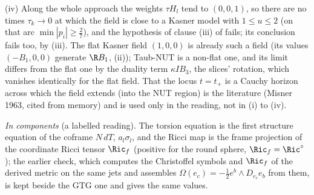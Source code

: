 (iv) Along the whole approach the weights $\tau H_{l}$ tend to $(0, 0, 1)$, so there are no times $\tau_{k} \to 0$ at which the field is close to a Kasner model with $1 \le u \le 2$ (on that arc $\min|p_{i}| \ge \tfrac27$), and the hypothesis of clause (iii) of  fails; its conclusion fails too, by (iii). The flat Kasner field $(1, 0, 0)$ is already such a field (its values $(-B_{1}, 0, 0)$ generate $\R B_{1}$, (ii)); Taub-NUT is a non-flat one, and its limit differs from the flat one by the duality term $\kappa IB_{3}$, the slices' rotation, which vanishes identically for the flat field. That the locus $t = t_{+}$ is a Cauchy horizon across which the field extends (into the NUT region) is the literature (Misner 1963, cited from memory) and is used only in the reading, not in (i) to (iv).

\emph{In components} (a labelled reading). The torsion equation is the first structure equation of the coframe $N\,dT$, $a_{l}\sigma_{l}$, and the Ricci map is the frame projection of the coordinate Ricci tensor $\Ric_{f}$ (positive for the round sphere, $\Ric_{f} = \Ric^{\circ}$); the earlier check, which computes the Christoffel symbols and $\Ric_{f}$ of the derived metric on the same jets and assembles $\Omega(e_{c}) = -\tfrac12 e^{b}\wedge D_{e_{c}}e_{b}$ from them, is kept beside the GTG one and gives the same values.

